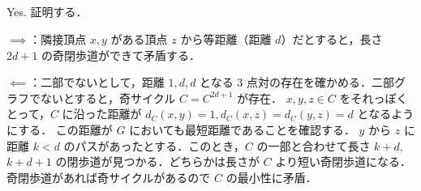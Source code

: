 \subsection{}
Yes. 証明する．

$\implies$：隣接頂点 $x,y$ がある頂点 $z$ から等距離（距離 $d$）だとすると，長さ $2d+1$ の奇閉歩道ができて矛盾する．

$\impliedby$：二部でないとして，距離 $1, d, d$ となる $3$ 点対の存在を確かめる．二部グラフでないとすると，奇サイクル $C = C^{2d+1}$ が存在．
$x,y,z\in C$ をそれっぽくとって，$C$ に沿った距離が $d_C(x,y) = 1, d_C(x,z) = d_C(y,z) = d$ となるようにする．
この距離が $G$ においても最短距離であることを確認する．
$y$ から $z$ に距離 $k < d$ のパスがあったとする．このとき，$C$ の一部と合わせて長さ $k + d$, $k+d+1$ の閉歩道が見つかる．どちらかは長さが $C$ より短い奇閉歩道になる．
奇閉歩道があれば奇サイクルがあるので $C$ の最小性に矛盾．